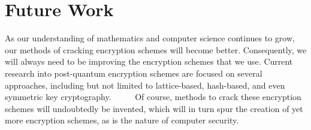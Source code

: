 \documentclass[letterpaper,twocolumn,12pt]{article}
\begin{document}
    \section*{Future Work}

    As our understanding of mathematics and computer science continues to grow,
    our methods of cracking encryption schemes will become better.
    Consequently, we will always need to be improving the encryption schemes
    that we use. Current research into post-quantum encryption schemes are
    focused on several approaches, including but not limited to lattice-based,
    hash-based, and even symmetric key cryptography.
    ~\cite{XMSS}
    ~\cite{SPHINCS}
    ~\cite{Symmetric}
    Of course, methods to
    crack these encryption schemes will undoubtedly be invented, which will
    in turn spur the creation of yet more encryption schemes, as is the nature
    of computer security.

    
    
\end{document}

